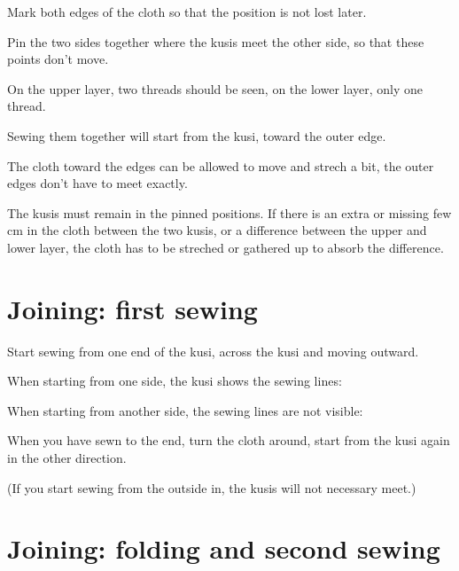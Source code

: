 Mark both edges of the cloth so that the position is not lost later.


Pin the two sides together where the kusis meet the other side, so that
these points don't move.

On the upper layer, two threads should be seen, on the lower layer, only
one thread.



Sewing them together will start from the kusi, toward the outer edge.

The cloth toward the edges can be allowed to move and strech a bit, the
outer edges don't have to meet exactly.

The kusis must remain in the pinned positions. If there is an extra or
missing few cm in the cloth between the two kusis, or a difference
between the upper and lower layer, the cloth has to be streched or
gathered up to absorb the difference.

\clearpage

\section{Joining: first sewing}

Start sewing from one end of the kusi, across the kusi and moving
outward.

When starting from one side, the kusi shows the sewing lines:


When starting from another side, the sewing lines are not visible:




When you have sewn to the end, turn the cloth around, start from the
kusi again in the other direction.

(If you start sewing from the outside in, the kusis will not necessary
meet.)

\clearpage

\section{Joining: folding and second sewing}

